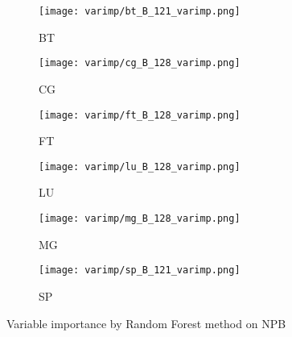 %

\begin{figure}
    \centering
    \begin{subfigure}[b]{0.4\textwidth}
        \texttt{[image: varimp/bt\_B\_121\_varimp.png]}
        \caption{BT}
        \label{fig:bt_varimp}
    \end{subfigure}
    \quad
    \begin{subfigure}[b]{0.4\textwidth}
        \texttt{[image: varimp/cg\_B\_128\_varimp.png]}
        \caption{CG}
        \label{fig:cg_varimp}
    \end{subfigure}
   
    \begin{subfigure}[b]{0.4\textwidth}
        \texttt{[image: varimp/ft\_B\_128\_varimp.png]}
        \caption{FT}
        \label{fig:ft_varimp}
    \end{subfigure}
    \quad
    \begin{subfigure}[b]{0.4\textwidth}
        \texttt{[image: varimp/lu\_B\_128\_varimp.png]}
        \caption{LU}
        \label{fig:lu_varimp}
    \end{subfigure}
  
    \begin{subfigure}[b]{0.4\textwidth}
        \texttt{[image: varimp/mg\_B\_128\_varimp.png]}
        \caption{MG}
        \label{fig:mg_varimp}
    \end{subfigure}
    \quad
    \begin{subfigure}[b]{0.4\textwidth}
        \texttt{[image: varimp/sp\_B\_121\_varimp.png]}
        \caption{SP}
        \label{fig:sp_varimp}
    \end{subfigure}
    \caption{Variable importance by Random Forest method on NPB}
    \label{fig:varmap_results}
\end{figure}

